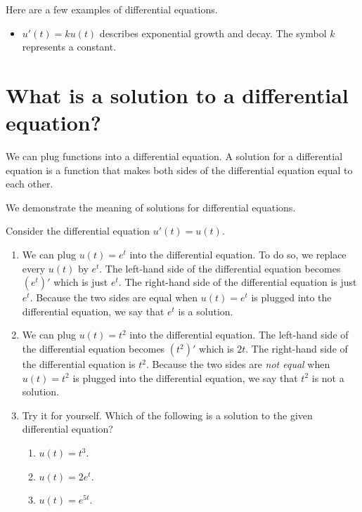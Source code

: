 \documentclass[../book.tex]{subfiles}
\begin{document}
Here are a few examples of differential equations.

\begin{itemize}
  \item \(u'(t) = k u(t)\) describes exponential growth and decay. The symbol \(k\) represents a constant.
\end{itemize}

\section{What is a solution to a differential equation?}
We can plug functions into a differential equation.  A solution for a differential equation is a function that makes both sides of the differential equation equal to each other.

\begin{example} \label{eg:de-1}
We demonstrate the meaning of solutions for differential equations.

Consider the differential equation \(u'(t) = u(t)\).

\begin{enumerate}
  \item We can plug \(u(t) = e^{t}\) into the differential equation. To do so, we replace every \(u(t)\) by \(e^{t}\). The left-hand side of the differential equation becomes \((e^{t})'\) which is just \(e^{t}\). The right-hand side of the differential equation is just \(e^{t}\).  Because the two sides are equal when \(u(t) = e^{t}\) is plugged into the differential equation, we say that \(e^{t}\) is a solution.
  \item We can plug \(u(t) = t^{2}\) into the differential equation. The left-hand side of the differential equation becomes \((t^{2})'\) which is \(2t\).  The right-hand side of the differential equation is \(t^{2}\). Because the two sides are \emph{not equal} when \(u(t) = t^{2}\) is plugged into the differential equation, we say that \(t^{2}\) is not a solution.
  \item Try it for yourself. Which of the following is a solution to the given differential equation?
  \begin{enumerate}
    \item \(u(t) = t^{3}\).
    \item \(u(t) = 2e^{t}\).
    \item \(u(t) = e^{5t}\).
  \end{enumerate}
\end{enumerate}
\end{example}
\end{document}
